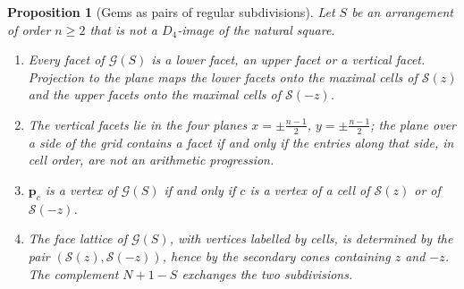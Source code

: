 \documentclass[11pt,a4paper]{article}
\theoremstyle{plain}
\newtheorem{proposition}[theorem]{Proposition}
\theoremstyle{definition}
\theoremstyle{remark}
\begin{document}
\begin{proposition}[Gems as pairs of regular subdivisions]
\label{prop:subdivisions}
Let $S$ be an arrangement of order $n\ge2$ that is not a $D_4$-image of the natural square.
\begin{enumerate}
\item Every facet of $\mathcal G(S)$ is a lower facet, an upper facet or a vertical facet. Projection to the plane maps the lower facets onto the maximal cells of $\mathcal S(z)$ and the upper facets onto the maximal cells of $\mathcal S(-z)$.
\item The vertical facets lie in the four planes $x=\pm\frac{n-1}2$, $y=\pm\frac{n-1}2$; the plane over a side of the grid contains a facet if and only if the entries along that side, in cell order, are not an arithmetic progression.
\item $\mathbf p_c$ is a vertex of $\mathcal G(S)$ if and only if $c$ is a vertex of a cell of $\mathcal S(z)$ or of $\mathcal S(-z)$.
\item The face lattice of $\mathcal G(S)$, with vertices labelled by cells, is determined by the pair $(\mathcal S(z),\mathcal S(-z))$, hence by the secondary cones containing $z$ and $-z$. The complement $N+1-S$ exchanges the two subdivisions.
\end{enumerate}
\end{proposition}
\end{document}
